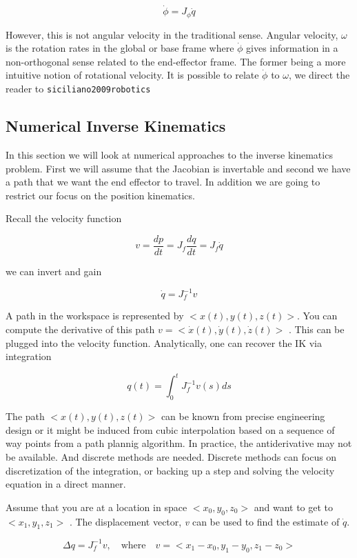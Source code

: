 \[\dot{\phi} =  J_\phi \dot{q}\]

However, this is not angular velocity in the traditional sense. Angular
velocity, \(\omega\) is the rotation rates in the global or base frame
where \(\dot{\phi}\) gives information in a non-orthogonal sense related
to the end-effector frame. The former being a more intuitive notion of
rotational velocity. It is possible to relate \(\dot{\phi}\) to
\(\omega\), we direct the reader to \texttt{siciliano2009robotics}

\hypertarget{numerical-inverse-kinematics}{%
\subsection{Numerical Inverse
Kinematics}\label{numerical-inverse-kinematics}}

In this section we will look at numerical approaches to the inverse
kinematics problem. First we will assume that the Jacobian is invertable
and second we have a path that we want the end effector to travel. In
addition we are going to restrict our focus on the position kinematics.

Recall the velocity function

\[\displaystyle v = \frac{dp}{dt} = J_f \frac{dq}{dt} = J_f \dot{q}\]

we can invert and gain

\[\displaystyle \dot{q}  = J_f^{-1} v\]

A path in the workspace is represented by \(<x(t),y(t),z(t)>\). You can
compute the derivative of this path
\(v = <\dot{x}(t),\dot{y}(t),\dot{z}(t)>\) . This can be plugged into
the velocity function. Analytically, one can recover the IK via
integration

\[q(t) = \int_0^t J_f^{-1} v(s)ds\]

The path \(<x(t),y(t),z(t)>\) can be known from precise engineering
design or it might be induced from cubic interpolation based on a
sequence of way points from a path plannig algorithm. In practice, the
antiderivative may not be available. And discrete methods are needed.
Discrete methods can focus on discretization of the integration, or
backing up a step and solving the velocity equation in a direct manner.

Assume that you are at a location in space \(<x_0,y_0,z_0>\) and want to
get to \(<x_1,y_1,z_1>\) . The displacement vector, \emph{v} can be used
to find the estimate of \(\dot{q}\).

\[\Delta q = J_f^{-1}v, \quad \mbox{where} \quad v = <x_1-x_0, y_1-y_0, z_1-z_0>\]

